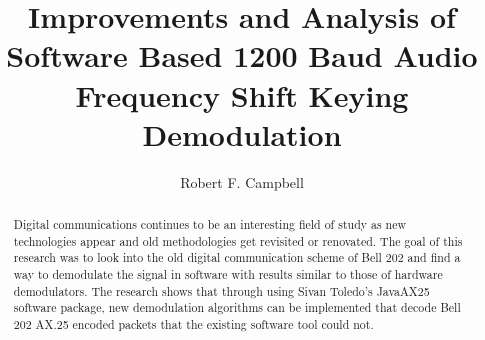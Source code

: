 \documentclass[12pt]{ucthesis}
\begin{document}
\title{Improvements and Analysis of Software Based 1200 Baud Audio Frequency Shift Keying Demodulation}
\author{Robert F. Campbell}
  
 
     
\maketitle

\begin{frontmatter}

\copyrightpage

\committeemembershippage

\begin{abstract}
Digital communications continues to be an interesting field of study as new technologies appear and old methodologies get revisited or renovated. The goal of this research was to look into the old digital communication scheme of Bell 202 and find a way to demodulate the signal in software with results similar to those of hardware demodulators. The research shows that through using Sivan Toledo’s JavaAX25 software package, new demodulation algorithms can be implemented that decode Bell 202 AX.25 encoded packets that the existing software tool could not.
\end{abstract}


\tableofcontents

\end{frontmatter}









\end{document}
